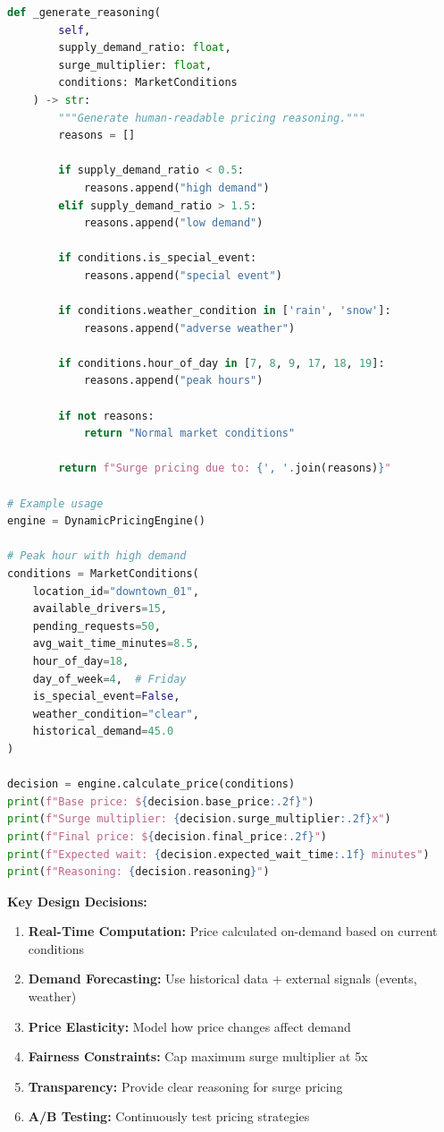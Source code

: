 \begin{lstlisting}[language=Python, caption=Dynamic Pricing System]
    def _generate_reasoning(
        self,
        supply_demand_ratio: float,
        surge_multiplier: float,
        conditions: MarketConditions
    ) -> str:
        """Generate human-readable pricing reasoning."""
        reasons = []

        if supply_demand_ratio < 0.5:
            reasons.append("high demand")
        elif supply_demand_ratio > 1.5:
            reasons.append("low demand")

        if conditions.is_special_event:
            reasons.append("special event")

        if conditions.weather_condition in ['rain', 'snow']:
            reasons.append("adverse weather")

        if conditions.hour_of_day in [7, 8, 9, 17, 18, 19]:
            reasons.append("peak hours")

        if not reasons:
            return "Normal market conditions"

        return f"Surge pricing due to: {', '.join(reasons)}"

# Example usage
engine = DynamicPricingEngine()

# Peak hour with high demand
conditions = MarketConditions(
    location_id="downtown_01",
    available_drivers=15,
    pending_requests=50,
    avg_wait_time_minutes=8.5,
    hour_of_day=18,
    day_of_week=4,  # Friday
    is_special_event=False,
    weather_condition="clear",
    historical_demand=45.0
)

decision = engine.calculate_price(conditions)
print(f"Base price: ${decision.base_price:.2f}")
print(f"Surge multiplier: {decision.surge_multiplier:.2f}x")
print(f"Final price: ${decision.final_price:.2f}")
print(f"Expected wait: {decision.expected_wait_time:.1f} minutes")
print(f"Reasoning: {decision.reasoning}")
\end{lstlisting}

\textbf{Key Design Decisions:}

\begin{enumerate}
    \item \textbf{Real-Time Computation:} Price calculated on-demand based on current conditions
    \item \textbf{Demand Forecasting:} Use historical data + external signals (events, weather)
    \item \textbf{Price Elasticity:} Model how price changes affect demand
    \item \textbf{Fairness Constraints:} Cap maximum surge multiplier at 5x
    \item \textbf{Transparency:} Provide clear reasoning for surge pricing
    \item \textbf{A/B Testing:} Continuously test pricing strategies
\end{enumerate}

